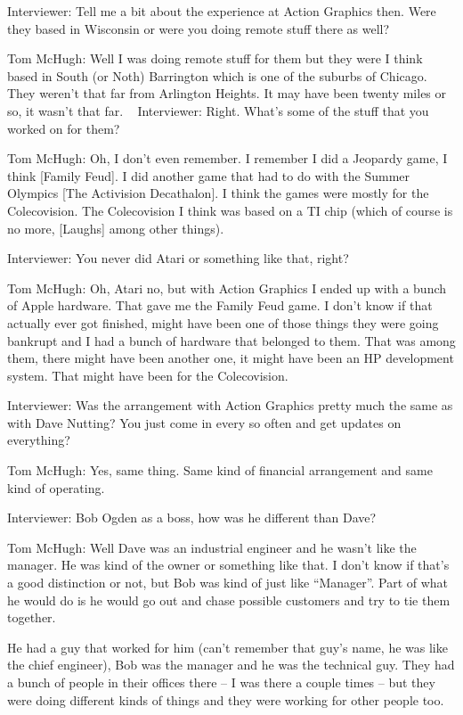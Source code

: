 \textcolor{interviewer}{Interviewer:} Tell me a bit about the experience at Action Graphics then. Were they based in Wisconsin or were you doing remote stuff there as well?

\textcolor{interviewee}{Tom McHugh:} Well I was doing remote stuff for them but they were I think based in South (or Noth) Barrington which is one of the suburbs of Chicago. They weren’t that far from Arlington Heights. It may have been twenty miles or so, it wasn’t that far.
 
\textcolor{interviewer}{Interviewer:} Right. What’s some of the stuff that you worked on for them?

\textcolor{interviewee}{Tom McHugh:} Oh, I don’t even remember. I remember I did a Jeopardy game, I think [Family Feud]. I did another game that had to do with the Summer Olympics [The Activision Decathalon]. I think the games were mostly for the Colecovision. The Colecovision I think was based on a TI chip (which of course is no more, [Laughs] among other things).

\textcolor{interviewer}{Interviewer:} You never did Atari or something like that, right?

\textcolor{interviewee}{Tom McHugh:} Oh, Atari no, but with Action Graphics I ended up with a bunch of Apple hardware. That gave me the Family Feud game. I don’t know if that actually ever got finished, might have been one of those things they were going bankrupt and I had a bunch of hardware that belonged to them. That was among them, there might have been another one, it might have been an HP development system. That might have been for the Colecovision.

\textcolor{interviewer}{Interviewer:} Was the arrangement with Action Graphics pretty much the same as with Dave Nutting? You just come in every so often and get updates on everything?

\textcolor{interviewee}{Tom McHugh:} Yes, same thing. Same kind of financial arrangement and same kind of operating.

\textcolor{interviewer}{Interviewer:} Bob Ogden as a boss, how was he different than Dave?

\textcolor{interviewee}{Tom McHugh:} Well Dave was an industrial engineer and he wasn’t like the manager. He was kind of the owner or something like that. I don’t know if that’s a good distinction or not, but Bob was kind of just like “Manager”. Part of what he would do is he would go out and chase possible customers and try to tie them together. 

He had a guy that worked for him (can’t remember that guy’s name, he was like the chief engineer), Bob was the manager and he was the technical guy. They had a bunch of people in their offices there – I was there a couple times – but they were doing different kinds of things and they were working for other people too.

